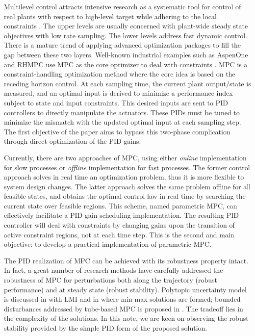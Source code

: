 \documentclass[5p,authoryear,times]{elsarticle}
\begin{document}
Multilevel control attracts intensive research as a systematic tool for control of real plants with respect to high-level target while adhering to the local constraints \citep{Tat08Advanced}. The upper levels are usually concerned with plant-wide steady state objectives with low rate sampling. The lower levels address fast dynamic control. There is a mature trend of applying advanced optimization packages to fill the gap between these two layers. Well-known industrial examples such as AspenOne and RHMPC use MPC as the core optimizer to deal with constraints \citep{Qin03survey,Fro06Model}. MPC is a constraint-handling optimization method where the core idea is based on the receding horizon control. At each sampling time, the current plant output/state is measured, and an optimal input is derived to minimize a performance index subject to state and input constraints. This desired inputs are sent to PID controllers to directly manipulate the actuators. These PIDs must be tuned to minimize the mismatch with the updated optimal input at each sampling step. The first objective of the paper aims to bypass this two-phase complication through direct optimization of the PID gains.

Currently, there are two approaches of MPC, using either \emph{online} implementation \citep{May00Constrained} for slow processes or \emph{offline} implementation \citep{Bem02explicit} for fast processes. The former control approach solves in real time an optimization problem, thus it is more flexible to system design changes. The latter approach solves the same problem offline for all feasible states, and obtains the optimal control law in real time by searching the current state over feasible regions. This scheme, named parametric MPC, can effectively facilitate a PID gain scheduling implementation. The resulting PID controller will deal with constraints by changing gains upon the transition of active constraint regions, not at each time step. This is the second and main objective: to develop a practical implementation of parametric MPC.

The PID realization of MPC can be achieved with its robustness property intact. In fact, a great number of research methods have carefully addressed the robustness of MPC for perturbations both along the trajectory (robust performance) and at steady state (robust stability). Polytopic uncertainty model is discussed in \citet{Gri03} with LMI and in \citet{Bem03Min,Nag04Open} where min-max solutions are formed; bounded disturbances addressed by tube-based MPC is proposed in \citet{Alv08,Mar11Stochastic}. The tradeoff lies in the complexity of the solutions. In this note, we are keen on observing the robust stability provided by the simple PID form of the proposed solution.
\end{document}
